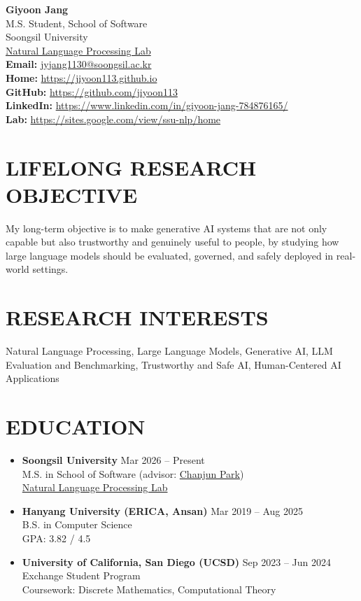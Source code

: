 \documentclass[10pt,a4paper]{article}
\newcommand{\seclabel}[1]{\section*{\uppercase{#1}}}
\newcommand{\cvitem}[2]{\textbf{#1} \hfill \small{#2}\\}
\begin{document}
\noindent
\begin{minipage}[c]{\textwidth}
    \begin{center}
        \textbf{\Huge{Giyoon Jang}} \\ \vspace{1.0em}
        M.S. Student, School of Software \\
        Soongsil University \\
        \href{https://sites.google.com/view/ssu-nlp/home}{Natural Language Processing Lab} \\
        \textbf{Email: }\href{mailto:jyjang1130@soongsil.ac.kr}{jyjang1130@soongsil.ac.kr} \\
        \textbf{Home: }\href{https://jiyoon113.github.io}{https://jiyoon113.github.io} \\
        \textbf{GitHub: }\href{https://github.com/jiyoon113}{https://github.com/jiyoon113} \\
        \textbf{LinkedIn: }\href{https://www.linkedin.com/in/giyoon-jang-784876165/}{https://www.linkedin.com/in/giyoon-jang-784876165/} \\
        \textbf{Lab: }\href{https://sites.google.com/view/ssu-nlp/home}{https://sites.google.com/view/ssu-nlp/home}
    \end{center}
\end{minipage}

\vspace{1em}

\seclabel{Lifelong Research Objective}
\small{My long-term objective is to make generative AI systems that are not only capable but also
trustworthy and genuinely useful to people, by studying how large language models should be
evaluated, governed, and safely deployed in real-world settings.}

\seclabel{Research Interests}
\small{Natural Language Processing, Large Language Models, Generative AI, LLM Evaluation and
Benchmarking, Trustworthy and Safe AI, Human-Centered AI Applications}

\seclabel{Education}
\begin{itemize}
    \item \cvitem{Soongsil University}{Mar 2026 -- Present}
    \small{M.S. in School of Software (advisor: \href{https://parkchanjun.github.io/}{Chanjun Park}) \\
    \href{https://sites.google.com/view/ssu-nlp/home}{Natural Language Processing Lab}} \vspace{0.6em}

    \item \cvitem{Hanyang University (ERICA, Ansan)}{Mar 2019 -- Aug 2025}
    \small{B.S. in Computer Science \\
    GPA: 3.82 / 4.5} \vspace{0.6em}

    \item \cvitem{University of California, San Diego (UCSD)}{Sep 2023 -- Jun 2024}
    \small{Exchange Student Program \\
    Coursework: Discrete Mathematics, Computational Theory}
\end{itemize}
\end{document}
